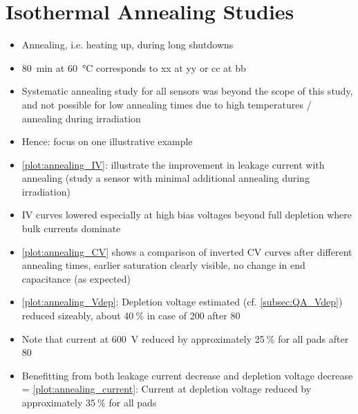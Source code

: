 \section{Isothermal Annealing Studies}
\label{sec:annealing}

\begin{itemize}
	\item Annealing, i.e. heating up, during long shutdowns
	\item \SI{80}{\minute} at \SI{60}{\celsius} corresponds to xx at yy or cc at bb
	\item Systematic annealing study for all sensors was beyond the scope of this study, and not possible for low annealing times due to high temperatures / annealing during irradiation
	\item Hence: focus on one illustrative example
	\item \ref{plot:annealing_IV}: illustrate the improvement in leakage current with annealing (study a sensor with minimal additional annealing during irradiation)
	\item IV curves lowered especially at high bias voltages beyond full depletion where bulk currents dominate
	\item \ref{plot:annealing_CV} shows a comparison of inverted CV curves after different annealing times, earlier saturation clearly visible, no change in end capacitance (as expected)
	\item \ref{plot:annealing_Vdep}: Depletion voltage estimated (cf. \ref{subsec:QA_Vdep}) reduced sizeably, about 40$~\%$ in case of \SI{200}{\micron} after \SI{80}{\min}
	\item Note that current at \SI{600}{\volt} reduced by approximately 25$~\%$ for all pads after \SI{80}{\min}
	\item Benefitting from both leakage current decrease and depletion voltage decrease = \ref{plot:annealing_current}: Current at depletion voltage reduced by approximately 35$~\%$ for all pads
\end{itemize}

